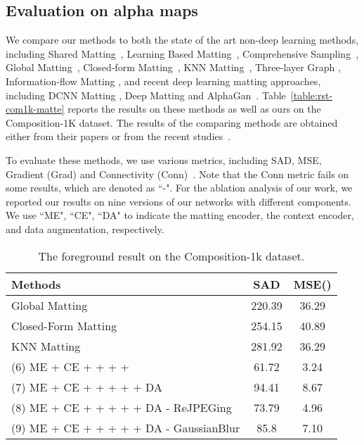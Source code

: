 \documentclass[10pt,twocolumn,letterpaper]{article}
\begin{document}
\subsection{Evaluation on alpha maps}
\label{sec:exp:alpha}


We compare our methods to both the state of the art non-deep learning methods, including Shared Matting~\cite{gastal2010shared}, Learning Based Matting~\cite{zheng2009learning}, Comprehensive Sampling~\cite{shahrian2013improving}, Global Matting~\cite{he2011global}, Closed-form Matting~\cite{levin2008closed}, KNN Matting~\cite{chen2013knn}, Three-layer Graph \cite{li2017three}, Information-flow Matting \cite{aksoy2017designing}, and recent deep learning matting approaches, including DCNN Matting \cite{cho2016natural}, Deep Matting \cite{xu2017deep} and AlphaGan~\cite{lutz2018alphagan}. Table~\ref{table:rst-com1k-matte} reports the results on these methods as well as ours on the Composition-1K dataset. The results of the comparing methods are obtained either from their papers or from the recent studies~\cite{lutz2018alphagan,xu2017deep}.

To evaluate these methods, we use various metrics, including SAD, MSE, Gradient (Grad) and Connectivity (Conn)~\cite{rhemann2009perceptually}. Note that the Conn metric fails on some results, which are denoted as ``-". For the ablation analysis of our work, we reported our results on nine versions of our networks with different components. We use ``ME", ``CE", ``DA" to indicate the matting encoder, the context encoder, and data augmentation, respectively. 

\begin{table}[t]
	\centering
	\caption{The foreground result on the Composition-1k dataset.}
	\label{table:rst-com1k-fg}
	\small
	\begin{tabular}{lcc}
			\hline
			\multicolumn{1}{m{50mm}}{Methods} & SAD & MSE() \\ 
			\hline

			\multicolumn{1}{m{50mm}}{Global Matting \cite{he2011global}} & 220.39 &36.29  \\
			\multicolumn{1}{m{50mm}}{Closed-Form Matting \cite{levin2008closed}} & 254.15 & 40.89 \\
			\multicolumn{1}{m{50mm}}{KNN Matting \cite{chen2013knn}} & 281.92 & 36.29 \\
\hline
			\multicolumn{1}{m{50mm}}{(6) ME + CE +  +  +   +  } & 61.72 & 3.24  \\
			\multicolumn{1}{m{50mm}}{(7) ME + CE +  +  +   +   + DA} & 94.41 & 8.67  \\
			\multicolumn{1}{m{50mm}}{(8) ME + CE +  +  +   +   + DA - ReJPEGing} &73.79 & 4.96  \\
			\multicolumn{1}{m{50mm}}{(9) ME + CE +  +  +   +   + DA - GaussianBlur} & 85.8 &7.10  \\
			\hline
	\end{tabular}\vspace{-0.1in}
\end{table}
\end{document}
